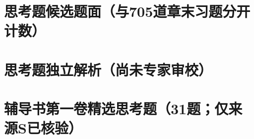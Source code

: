 \documentclass[UTF8,a4paper,11pt]{ctexart}
\begin{document}
\clearpage
\part*{思考题候选题面（与705道章末习题分开计数）}



















\clearpage
\part*{思考题独立解析（尚未专家审校）}





















\clearpage
\part*{辅导书第一卷精选思考题（31题；仅来源S已核验）}











\clearpage
\end{document}
